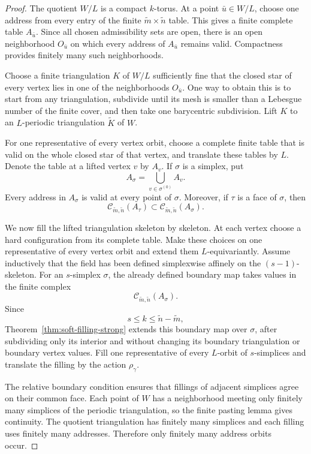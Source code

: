\documentclass[11pt,reqno]{amsart}
\numberwithin{equation}{section}
\theoremstyle{definition}
\theoremstyle{remark}
\begin{document}
\begin{proof}
The quotient $W/L$ is a compact $k$-torus.  At a point $\bar u\in W/L$,
choose one address from every entry of the finite
$\widetilde m\times\widetilde n$ table.  This gives a finite complete table
$A_{\bar u}$.  Since all chosen admissibility sets are open, there is an open
neighborhood $O_{\bar u}$ on which every address of $A_{\bar u}$ remains
valid.  Compactness provides finitely many such neighborhoods.

Choose a finite triangulation $K$ of $W/L$ sufficiently fine that the closed
star of every vertex lies in one of the neighborhoods $O_{\bar u}$.  One way
to obtain this is to start from any triangulation, subdivide until its mesh is
smaller than a Lebesgue number of the finite cover, and then take one
barycentric subdivision.  Lift $K$ to an $L$-periodic triangulation
$\widetilde K$ of $W$.

For one representative of every vertex orbit, choose a complete finite table
that is valid on the whole closed star of that vertex, and translate these
tables by $L$.  Denote the table at a lifted vertex $v$ by $A_v$.  If
$\sigma$ is a simplex, put
\[
 A_\sigma=\bigcup_{v\in\sigma^{(0)}}A_v.
\]
Every address in $A_\sigma$ is valid at every point of $\sigma$.  Moreover,
if $\tau$ is a face of $\sigma$, then
\[
 \mathcal C_{\widetilde m,\widetilde n}(A_\tau)
 \subset
 \mathcal C_{\widetilde m,\widetilde n}(A_\sigma).
\]

We now fill the lifted triangulation skeleton by skeleton.  At each vertex
choose a hard configuration from its complete table.  Make these choices on
one representative of every vertex orbit and extend them $L$-equivariantly.
Assume inductively that the field has been defined simplexwise affinely on
the $(s-1)$-skeleton.  For an $s$-simplex $\sigma$, the already defined
boundary map takes values in the finite complex
\[
 \mathcal C_{\widetilde m,\widetilde n}(A_\sigma).
\]
Since
\[
 s\le k\le\widetilde n-\widetilde m,
\]
Theorem~\ref{thm:soft-filling-strong} extends this boundary map over
$\sigma$, after subdividing only its interior and without changing its
boundary triangulation or boundary vertex values.  Fill one representative
of every $L$-orbit of $s$-simplices and translate the filling by the action
$\rho_\gamma$.

The relative boundary condition ensures that fillings of adjacent simplices
agree on their common face.  Each point of $W$ has a neighborhood meeting
only finitely many simplices of the periodic triangulation, so the finite
pasting lemma gives continuity.  The quotient triangulation has finitely
many simplices and each filling uses finitely many addresses.  Therefore
only finitely many address orbits occur.
\end{proof}
\end{document}

